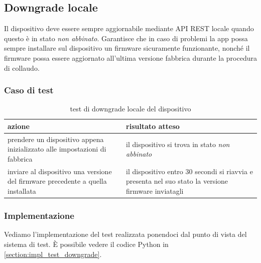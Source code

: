 \documentclass[12pt,a4paper,twoside,titlepage]{book}
\begin{document}
\subsection{Downgrade locale}
\label{section:test_downgrade}

Il dispositivo deve essere sempre aggiornabile mediante API REST locale quando questo
è in stato \textit{non abbinato}. Garantisce che in caso di problemi la app possa sempre
installare sul dispositivo un \gls{firmware} sicuramente funzionante, nonché il \gls{firmware}
possa essere aggiornato all’ultima versione fabbrica durante la procedura di collaudo.

\subsubsection{Caso di test}

\begin{table}
    \centering
    \begin{tabular}{| p{} | p{} |}
        \hline
        \textbf{azione} & \textbf{risultato atteso} \\ \hline
        prendere un dispositivo appena inizializzato alle impostazioni di fabbrica & il dispositivo si trova in stato \textit{non abbinato} \\ \hline
        inviare al dispositivo una versione del \gls{firmware} precedente a quella installata & il dispositivo entro 30 secondi si riavvia e presenta nel suo stato la versione \gls{firmware} inviatagli \\ \hline
    \end{tabular}
    \caption{test di downgrade locale del dispositivo}
\end{table}

\subsubsection{Implementazione}
Vediamo l'implementazione del test realizzata ponendoci dal punto di vista del sistema di test. 
È possibile vedere il codice Python in \autoref{section:impl_test_downgrade}.
\end{document}
